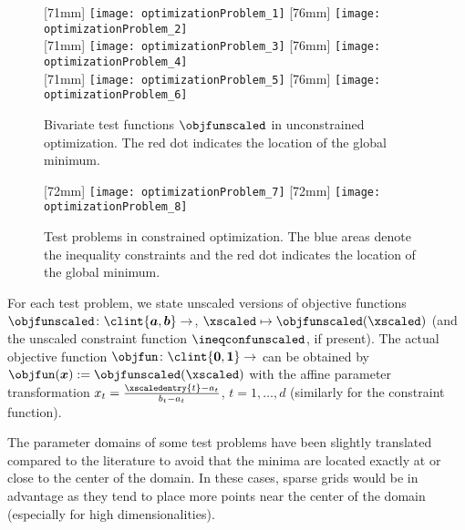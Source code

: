 \begin{figure}
  [71mm]{%
    \texttt{[image: optimizationProblem\_1]}%
  }%
  \hfill%
  [76mm]{%
    \texttt{[image: optimizationProblem\_2]}%
  }\\[2.5mm]%
  [71mm]{%
    \texttt{[image: optimizationProblem\_3]}%
  }%
  \hfill%
  [76mm]{%
    \texttt{[image: optimizationProblem\_4]}%
  }\\[2.5mm]%
  [71mm]{%
    \texttt{[image: optimizationProblem\_5]}%
  }%
  \hfill%
  [76mm]{%
    \texttt{[image: optimizationProblem\_6]}%
  }%
  \caption[%
    Unconstrained test problems%
  ]{%
    Bivariate test functions $\objfunscaled$ in unconstrained optimization.
    The \textcolor{C1}{red dot} indicates the location of the
    global minimum.%
  }%
  \label{fig:unconstrainedOptimizationProblem}%
\end{figure}

\begin{figure}
  [72mm]{%
    \texttt{[image: optimizationProblem\_7]}%
  }%
  \hfill%
  [72mm]{%
    \texttt{[image: optimizationProblem\_8]}%
  }%
  \caption[%
    Constrained test problems%
  ]{%
    Test problems in constrained optimization.
    The \textcolor{C0}{blue areas} denote the inequality constraints and
    the \textcolor{C1}{red dot} indicates the location of the
    global minimum.%
  }%
  \label{fig:constrainedOptimizationProblem}%
\end{figure}

For each test problem, we state unscaled versions of objective functions
$\objfunscaled\colon \clint{\*a, \*b} \to \real$,
$\xscaled \mapsto \objfunscaled(\xscaled)$
(and the unscaled constraint function $\ineqconfunscaled$, if present).
The actual objective function $\objfun\colon \clint{\*0, \*1} \to \real$
can be obtained by $\objfun(\*x) := \objfunscaled(\xscaled)$
with the affine parameter transformation
$x_t = \tfrac{\xscaledentry{t} - a_t}{b_t - a_t}$, $t = 1, \dotsc, d$
(similarly for the constraint function).

\vspace*{1em}

The parameter domains of some test problems have been slightly translated
compared to the literature
to avoid that the minima are located exactly at or close to
the center of the domain.
In these cases, sparse grids would be in advantage as
they tend to place more points near the center of the domain
(especially for high dimensionalities).

